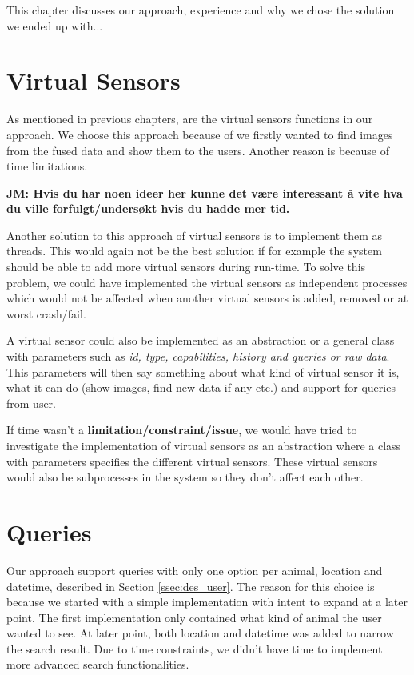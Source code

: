 \documentclass[USenglish]{uit-thesis}
\begin{document}
This chapter discusses our approach, experience and why we chose the solution we ended up with...

\section{Virtual Sensors}
As mentioned in previous chapters, are the virtual sensors functions in our approach. We choose this approach because of we firstly wanted to find images from the fused data and show them to the users. Another reason is because of time limitations.

\textbf{JM: Hvis du har noen ideer her kunne det være interessant å vite hva du ville forfulgt/undersøkt hvis du hadde mer tid.}

Another solution to this approach of virtual sensors is to implement them as threads. This would again not be the best solution if for example the system should be able to add more virtual sensors during run-time. To solve this problem, we could have implemented the virtual sensors as independent processes which would not be affected when another virtual sensors is added, removed or at worst crash/fail. 

A virtual sensor could also be implemented as an abstraction or a general class with parameters such as \textit{id, type, capabilities, history and queries or raw data}. This parameters will then say something about what kind of virtual sensor it is, what it can do (show images, find new data if any etc.) and support for queries from user.

If time wasn't a \textbf{limitation/constraint/issue}, we would have tried to investigate the implementation of virtual sensors as an abstraction where a class with parameters specifies the different virtual sensors. These virtual sensors would also be subprocesses in the system so they don't affect each other. 


\section{Queries}
Our approach support queries with only one option per animal, location and datetime, described in Section \ref{ssec:des_user}. The reason for this choice is because we started with a simple implementation with intent to expand at a later point. The first implementation only contained what kind of animal the user wanted to see. At later point, both location and datetime was added to narrow the search result. Due to time constraints, we didn't have time to implement more advanced search functionalities.
\end{document}
